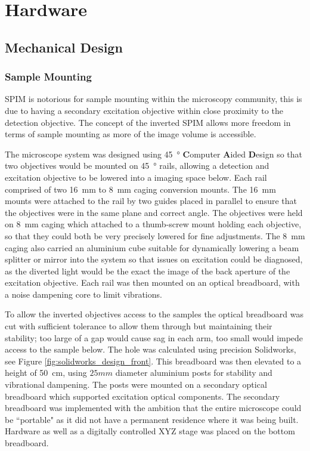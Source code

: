 \section{Hardware}


\subsection{Mechanical Design}

\subsubsection{Sample Mounting}

SPIM is notorious for sample mounting within the microscopy community, this is due to having a secondary excitation objective within close proximity to the detection objective.
The concept of the inverted SPIM \cite{Wu2011} allows more freedom in terms of sample mounting as more of the image volume is accessible.

The microscope system was designed using \SI{45}{\degree} \textbf{C}omputer \textbf{A}ided \textbf{D}esign so that two objectives would be mounted on \SI{45}{\degree} rails, allowing a detection and excitation objective to be lowered into a imaging space below.
Each rail comprised of two \SI{16}{\milli\meter} to \SI{8}{\milli\meter} caging conversion mounts.
The \SI{16}{\milli\meter} mounts were attached to the rail by two guides placed in parallel to ensure that the objectives were in the same plane and correct angle.
The objectives were held on \SI{8}{\milli\meter} caging which attached to a thumb-screw mount holding each objective, so that they could both be very precisely lowered for fine adjustments.
The \SI{8}{\milli\meter} caging also carried an aluminium cube suitable for dynamically lowering a beam splitter or mirror into the system so that issues on excitation could be diagnosed, as the diverted light would be the exact the image of the back aperture of the excitation objective.
Each rail was then mounted on an optical breadboard, with a noise dampening core to limit vibrations.

To allow the inverted objectives access to the samples the optical breadboard was cut with sufficient tolerance to allow them through but maintaining their stability; too large of a gap would cause sag in each arm, too small would impede access to the sample below.
The hole was calculated using precision Solidworks, see Figure \ref{fig:solidworks_design_front}.
This breadboard was then elevated to a height of \SI{50}{\centi\meter}, using $25mm$ diameter aluminium posts for stability and vibrational dampening.
The posts were mounted on a secondary optical breadboard which supported excitation optical components.
The secondary breadboard was implemented with the ambition that the entire microscope could be ``portable" as it did not have a permanent residence where it was being built.
Hardware as well as a digitally controlled XYZ stage was placed on the bottom breadboard.

